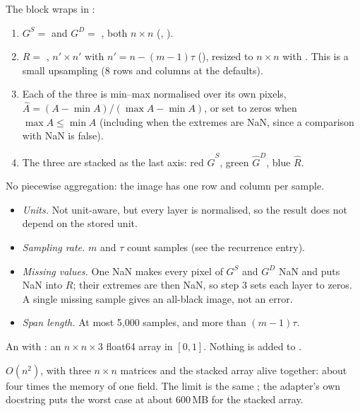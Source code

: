 The block wraps  in
:
\begin{enumerate}
\item $G^{S} = $  and $G^{D} = $ , both
  $n \times n$ (, ).
\item $R = $ , $n' \times n'$ with $n' = n-(m-1)\tau$
  (), resized to $n \times n$ with
  . This is a small upsampling
  (8 rows and columns at the defaults).
\item Each of the three is min--max normalised over its own pixels,
  $\hat A = (A - \min A)/(\max A - \min A)$, or set to zeros when $\max A \le \min A$
  (including when the extremes are NaN, since a comparison with NaN is false).
\item The three are stacked as the last axis: red $\hat G^{S}$, green $\hat G^{D}$, blue
  $\hat R$.
\end{enumerate}
No piecewise aggregation: the image has one row and column per sample.

\begin{itemize}
\item \emph{Units.} Not unit-aware, but every layer is normalised, so the result does not
  depend on the stored unit.
\item \emph{Sampling rate.} $m$ and $\tau$ count samples (see the recurrence entry).
\item \emph{Missing values.} One NaN makes every pixel of $G^S$ and $G^D$ NaN and puts NaN
  into $R$; their extremes are then NaN, so step 3 sets each layer to zeros. A single
  missing sample gives an all-black image, not an error.
\item \emph{Span length.} At most 5{,}000 samples, and more than $(m-1)\tau$.
\end{itemize}

An  with : an $n \times n \times 3$ float64 array in
$[0,1]$. Nothing is added to .

$O(n^2)$, with three $n \times n$ matrices and the stacked array alive together: about four
times the memory of one field. The limit is the same ; the
adapter's own docstring puts the worst case at about 600\,MB for the stacked array.


